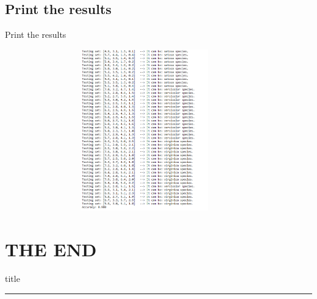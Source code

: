 \documentclass{beamer}
\begin{document}
\subsection{Print the results}
    \begin{frame}{Print the results}
        \begin{center}
            \begin{figure}
                \begin{center}
                     \includegraphics[width = 10cm, height = 7cm]{Theme/images/results2.PNG}
                \end{center}
            \end{figure}
        \end{center}
    \end{frame}

\section{THE END}
    \begin{frame}[plain]
        \vfill
      \centering
      \begin{beamercolorbox}[sep=8pt,center,shadow=true,rounded=true]{title}
        \insertsectionhead\par%
        \color{oxfordblue}\noindent\rule{2cm}{1pt} \\
      \end{beamercolorbox}
      \vfill
  \end{frame}
\end{document}
